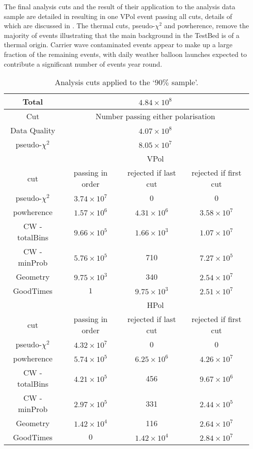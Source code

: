 The final analysis cuts and the result of their application to the analysis data sample are detailed in  resulting in one VPol event passing all cuts, details of which are discussed in . The thermal cuts, pseudo-$\chi^{2}$ and powherence, remove the majority of events illustrating that the main background in the TestBed is of a thermal origin. Carrier wave contaminated events appear to make up a large fraction of the remaining events, with daily weather balloon launches expected to contribute a significant number of events year round. 

\begin{table}
  \begin{center}
    \begin{tabular}{ c || c | c | c }
      Total & \multicolumn{3}{c}{ $4.84 \times 10^{8}$}\\
      \hline
      Cut & \multicolumn{3}{c}{ Number passing either polarisation}\\      
      \hline
      Data Quality & \multicolumn{3}{c}{$4.07 \times 10^8$}\\
      pseudo-$\chi^{2}$ & \multicolumn{3}{c}{$8.05 \times 10^7$}\\
      \hline\hline
      & \multicolumn{3}{c}{VPol}\\
      \hline
      cut & passing in order & rejected if last cut & rejected if first cut \\
      \hline
      pseudo-$\chi^{2}$ & $3.74 \times 10^7$ & 0 & 0\\
      powherence & $1.57 \times 10^6$ & $4.31 \times 10^6$ & $3.58 \times 10^7$\\
      CW - totalBins & $9.66 \times 10^5$ & $1.66 \times 10^3$ & $1.07 \times 10^7$\\
      CW - minProb & $5.76 \times 10^5$ & 710 & $7.27 \times 10^5$\\
      Geometry & $9.75 \times 10^3$ & 340 & $2.54 \times 10^7$\\
      GoodTimes & $1$ & $9.75 \times 10^3$ & $2.51 \times 10^7$\\
      \hline\hline
      & \multicolumn{3}{c}{HPol}\\
      \hline
      cut & passing in order & rejected if last cut & rejected if first cut \\
      \hline
      pseudo-$\chi^{2}$ & $4.32 \times 10^7$ & 0 & 0\\
      powherence & $5.74 \times 10^5$ & $6.25 \times 10^6$ & $4.26 \times 10^7$\\
      CW - totalBins & $4.21 \times 10^5$ & 456 & $9.67 \times 10^6$\\
      CW - minProb & $2.97 \times 10^5$ & 331 & $2.44 \times 10^5$\\
      Geometry & $1.42 \times 10^4$ & 116 & $2.64 \times 10^7$\\
      GoodTimes & $0$ & $1.42 \times 10^4$ & $2.84 \times 10^7$\\      
      \end{tabular} 
    \caption{Analysis cuts applied to the `$90 \%$ sample'.}
    \label{tab:Analysis:Cut-Flow}
  \end{center}
\end{table}

